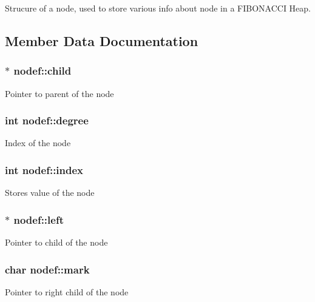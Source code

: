 Strucure of a node, used to store various info about node in a F\+I\+B\+O\+N\+A\+C\+CI Heap. 

\subsection{Member Data Documentation}
\subsubsection[{\texorpdfstring{child}{child}}]{$\ast$ nodef\+::child}\hypertarget{structnodef_a03c0d01036bbca579381e8f93df0ad87}{}\label{structnodef_a03c0d01036bbca579381e8f93df0ad87}
Pointer to parent of the node 
\subsubsection[{\texorpdfstring{degree}{degree}}]{\setlength{\rightskip}{0pt plus 5cm}int nodef\+::degree}\hypertarget{structnodef_a0a29ea193cba925e68dbcf3ccc673203}{}\label{structnodef_a0a29ea193cba925e68dbcf3ccc673203}
Index of the node 
\subsubsection[{\texorpdfstring{index}{index}}]{\setlength{\rightskip}{0pt plus 5cm}int nodef\+::index}\hypertarget{structnodef_a7d8ce9388f378b24275972f1eaa8d8dd}{}\label{structnodef_a7d8ce9388f378b24275972f1eaa8d8dd}
Stores value of the node 
\subsubsection[{\texorpdfstring{left}{left}}]{$\ast$ nodef\+::left}\hypertarget{structnodef_ae257022b5d5765c7cad17fe2af4bd89f}{}\label{structnodef_ae257022b5d5765c7cad17fe2af4bd89f}
Pointer to child of the node 
\subsubsection[{\texorpdfstring{mark}{mark}}]{\setlength{\rightskip}{0pt plus 5cm}char nodef\+::mark}\hypertarget{structnodef_a8a6b8531e0ce2c5ef6d6e1afbcad6440}{}\label{structnodef_a8a6b8531e0ce2c5ef6d6e1afbcad6440}
Pointer to right child of the node 
